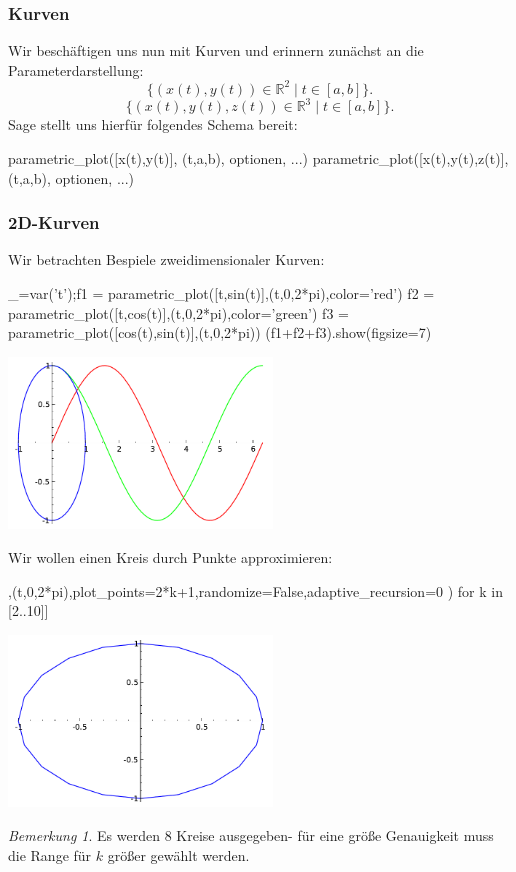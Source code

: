 \documentclass[fontsize=12pt,paper=a4,twoside,bibtotoc,idxtotoc,
liststotoc,pagesize,BCOR1.2cm,DIV15,chapterprefix,pagesize=pdftex]{scrbook}
\theoremstyle{plain}
\theoremstyle{definition}
\theoremstyle{remark}
\newtheorem{bem}[equation]{Bemerkung}
\begin{document}
\subsubsection{Kurven}
Wir beschäftigen uns nun mit Kurven und erinnern zunächst an die Parameterdarstellung: 
\[
 \{(x(t),y(t)) \in \mathbb{R}^2 \;|\; t \in [a,b]\}.
\]
\[
 \{(x(t),y(t),z(t)) \in \mathbb{R}^3 \;|\; t \in [a,b] \}.
\]
Sage stellt uns hierfür folgendes Schema bereit:
\begin{sagein}
parametric_plot([x(t),y(t)], (t,a,b), optionen, ...)
parametric_plot([x(t),y(t),z(t)], (t,a,b), optionen, ...)
\end{sagein}

\subsubsection{2D-Kurven}
Wir betrachten Bespiele zweidimensionaler Kurven:
\begin{sagein}
_=var('t');f1 = parametric_plot([t,sin(t)],(t,0,2*pi),color='red')
f2 = parametric_plot([t,cos(t)],(t,0,2*pi),color='green')
f3 = parametric_plot([cos(t),sin(t)],(t,0,2*pi))
(f1+f2+f3).show(figsize=7)
\end{sagein}
\begin{center}
\includegraphics[width=7cm]{parametric2d.pdf} 
\end{center}
Wir wollen einen Kreis durch Punkte approximieren:
\begin{sagein}
[parametric_plot([cos(t),sin(t)],(t,0,2*pi),plot_points=2*k+1,randomize=False,adaptive_recursion=0 ) for k in [2..10]]
\end{sagein}
\begin{center}
\includegraphics[width=7cm]{parametric2d_2.pdf} 
\end{center}
\begin{bem}
 Es werden 8 Kreise ausgegeben- für eine größe Genauigkeit muss die Range für $k$ größer gewählt werden.
\end{bem}
\end{document}
